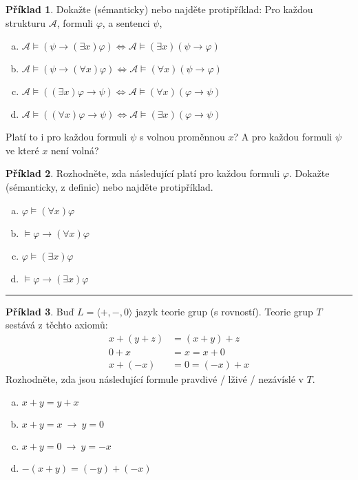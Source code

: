 \documentclass{amsart}
\theoremstyle{definition}
\newtheorem{problem}{Příklad}
\begin{document}
\bigskip\begin{problem}
Dokažte (sémanticky) nebo najděte protipříklad: Pro každou strukturu $\mathcal{A}$, formuli $\varphi$, a sentenci $\psi$,
\begin{enumerate}[(a)]
\item $\mathcal{A}\models (\psi \to (\exists x)\varphi) \Leftrightarrow \mathcal{A}\models (\exists x)(\psi \to \varphi)$
\item $\mathcal{A}\models (\psi \to (\forall x)\varphi) \Leftrightarrow \mathcal{A}\models (\forall x)(\psi \to \varphi)$
\item $\mathcal{A}\models ((\exists x)\varphi \to \psi) \Leftrightarrow \mathcal{A}\models (\forall x)(\varphi \to \psi)$
\item $\mathcal{A}\models ((\forall x)\varphi \to \psi ) \Leftrightarrow \mathcal{A}\models (\exists x)(\varphi \to \psi)$
\end{enumerate}
Platí to i pro každou formuli $\psi$ s volnou proměnnou $x$? A pro každou formuli $\psi$ ve které $x$ není volná?
\end{problem}

\newpage
\begin{problem}
Rozhodněte, zda následující platí pro každou formuli $\varphi$. Dokažte (sémanticky, z definic) nebo najděte protipříklad.
\begin{enumerate}[(a)]
   \item $\varphi \models (\forall x)\varphi$
   \item $\models \varphi \to (\forall x)\varphi$
   \item $\varphi \models (\exists x)\varphi$
   \item $\models \varphi \to (\exists x)\varphi$
\end{enumerate}
\end{problem}

\medskip\hrule

\bigskip\begin{problem}
Buď $L=\langle +, -, 0\rangle$ jazyk teorie grup (s rovností). Teorie grup $T$ sestává z těchto axiomů:
\begin{align*}
x+(y+z)&=(x+y)+z\\
0+x&=x=x+0\\
x+(-x)&=0=(-x)+x
\end{align*}
Rozhodněte, zda jsou následující formule pravdivé / lživé / nezávíslé v $T$.
\begin{enumerate}[(a)]
    \item $x+y=y+x$
    \item $x+y=x\ \rightarrow\ y=0$
    \item $x+y=0\ \rightarrow\ y=-x$
    \item $-(x+y)=(-y)+(-x)$
\end{enumerate}
\end{problem}
\end{document}
